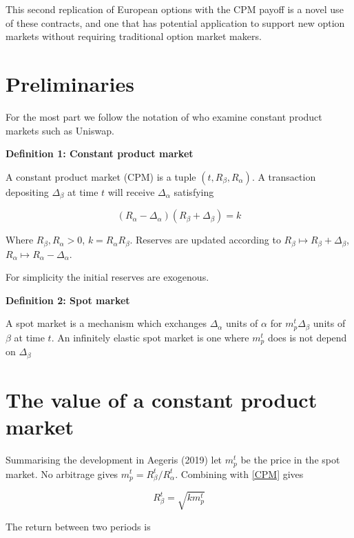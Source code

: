 \documentclass[12pt]{article}
\begin{document}

This second replication of European options with the CPM payoff is a novel use of these contracts, and one that has potential application to support new option markets without requiring traditional option market makers. 

\section{Preliminaries}

For the most part we follow the notation of \cite{ang20} who examine constant product markets such as Uniswap.


\textbf{Definition 1: Constant product market}

A constant product market (CPM) is a tuple $(t, R_\beta, R_\alpha)$. A transaction depositing $\Delta_\beta$ at time $t$ will receive $\Delta_\alpha$ satisfying

\begin{equation} \label{CPM}
(R_\alpha - \Delta_\alpha)(R_\beta + \Delta_\beta) = k
\end{equation}

Where $R_\beta,R_\alpha >0$,  $k=R_\alpha R_\beta$. Reserves are updated according to $R_\beta \mapsto R_\beta + \Delta_\beta$, $R_\alpha \mapsto R_\alpha - \Delta_\alpha$.

For simplicity the initial reserves are exogenous.


\textbf{Definition 2: Spot market}

A spot market is a mechanism which exchanges $\Delta_\alpha$ units of $\alpha$ for $m_p^t\Delta_\beta$ units of $\beta$ at time $t$. An infinitely elastic spot market is one where $m_p^t$ does is not depend on $\Delta_\beta$

\section{The value of a constant product market}

Summarising the development in Aegeris (2019) let $m_p^t$ be the price in the spot market. No arbitrage  gives $m_p^t = R_\beta^t/R_\alpha^t$. Combining with \ref{CPM} gives 

\begin{equation}
R_\beta^t= \sqrt{km_p^t}
\end{equation}

The return between two periods is
\end{document}
